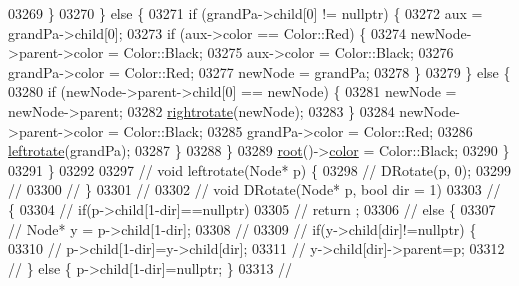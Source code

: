 \begin{DoxyCode}
03269                     \}
03270                 \} \textcolor{keywordflow}{else} \{
03271                     \textcolor{keywordflow}{if} (grandPa->child[0] != \textcolor{keyword}{nullptr}) \{
03272                         aux = grandPa->child[0];
03273                         \textcolor{keywordflow}{if} (aux->color == Color::Red) \{
03274                             newNode->parent->color = Color::Black;
03275                             aux->color = Color::Black;
03276                             grandPa->color = Color::Red;
03277                             newNode = grandPa;
03278                         \}
03279                     \} \textcolor{keywordflow}{else} \{
03280                         \textcolor{keywordflow}{if} (newNode->parent->child[0] == newNode) \{
03281                             newNode = newNode->parent;
03282                             \hyperlink{classaed2_1_1map_a816d69fa4dfe18a984dc3628fee14e2f_a816d69fa4dfe18a984dc3628fee14e2f}{rightrotate}(newNode);
03283                         \}
03284                         newNode->parent->color = Color::Black;
03285                         grandPa->color = Color::Red;
03286                         \hyperlink{classaed2_1_1map_ad764851f1534f2db0964c4f729056a1e_ad764851f1534f2db0964c4f729056a1e}{leftrotate}(grandPa);
03287                     \}
03288                 \}
03289                 \hyperlink{classaed2_1_1map_a07ab50eda249a57858a34037d4c4c7b2_a07ab50eda249a57858a34037d4c4c7b2}{root}()->\hyperlink{structaed2_1_1map_1_1Node_a58dd9993fee8ee3eaa5716b72a3eca47_a58dd9993fee8ee3eaa5716b72a3eca47}{color} = Color::Black;
03290             \}
03291         \}
03292 
03297 \textcolor{comment}{//        void leftrotate(Node* p) \{}
03298 \textcolor{comment}{//            DRotate(p, 0);}
03299 \textcolor{comment}{//}
03300 \textcolor{comment}{//        \}}
03301 \textcolor{comment}{//}
03302 \textcolor{comment}{//        void DRotate(Node* p, bool dir = 1)}
03303 \textcolor{comment}{//        \{}
03304 \textcolor{comment}{//            if(p->child[1-dir]==nullptr)}
03305 \textcolor{comment}{//                return ;}
03306 \textcolor{comment}{//            else \{}
03307 \textcolor{comment}{//                Node* y = p->child[1-dir];}
03308 \textcolor{comment}{//}
03309 \textcolor{comment}{//                if(y->child[dir]!=nullptr) \{}
03310 \textcolor{comment}{//                    p->child[1-dir]=y->child[dir];}
03311 \textcolor{comment}{//                    y->child[dir]->parent=p;}
03312 \textcolor{comment}{//                \} else \{ p->child[1-dir]=nullptr; \}}
03313 \textcolor{comment}{//}

\end{DoxyCode}
